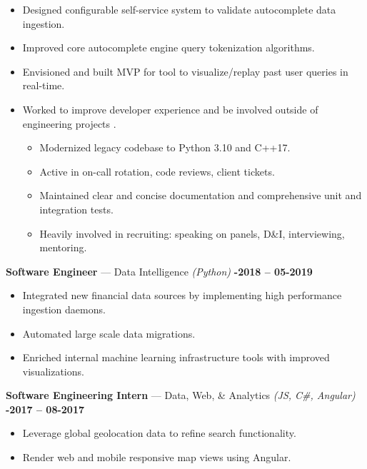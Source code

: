 \documentclass[margin,10pt]{res/res}
\begin{document}
\begin{resume}
\begin{itemize}
\begin{itemize}
        \end{itemize}
        \item Designed configurable self-service system to validate autocomplete data ingestion.
        \item Improved core autocomplete engine query tokenization algorithms.
        \item Envisioned and built MVP for tool to visualize/replay past user queries in real-time.
        \item Worked to improve developer experience and be involved outside of engineering projects .
        \begin{itemize}
            \item Modernized legacy codebase to Python 3.10 and C++17.
            \item Active in on-call rotation, code reviews, client tickets.
            \item Maintained clear and concise documentation and comprehensive unit and integration tests.
            \item Heavily involved in recruiting: speaking on panels, D\&I, interviewing, mentoring.
        \end{itemize}
    \end{itemize}
    \textbf{Software Engineer} --- Data Intelligence
    \textit{(Python)}\hfill
    \textsc{\bfseries{}-2018 -- 05-2019}
    \vspace{0.5em}
    \begin{itemize}
        \item Integrated new financial data sources by implementing high performance ingestion daemons.
        \item Automated large scale data migrations.
        \item Enriched internal machine learning infrastructure tools with improved visualizations.
    \end{itemize}
    \textbf{Software Engineering Intern} --- Data, Web, \& Analytics
    \textit{(JS, C\#, Angular)}\hfill
    \textsc{\bfseries{}-2017 -- 08-2017}
    \vspace{0.5em}
    \begin{itemize}
        \item Leverage global geolocation data to refine search functionality.
        \item Render web and mobile responsive map views using Angular.
    \end{itemize}

    \vspace{4pt}
    

\end{resume}
\end{document}
